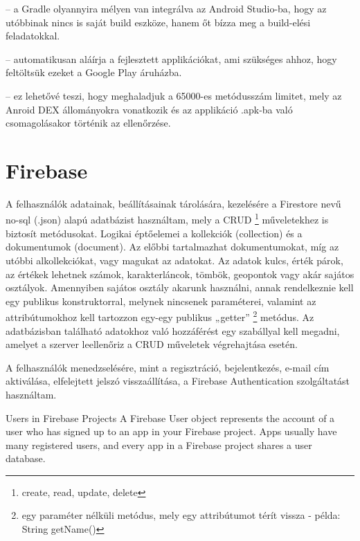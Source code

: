 \begin{description}
	\setlength{\itemsep}{0.04mm}
	\item[Teljes integráció az Android Studio-val] -- a Gradle olyannyira mélyen van integrálva az Android Studio-ba, hogy az utóbbinak nincs is saját build eszköze, hanem őt bízza meg a build-elési feladatokkal.
	\item[Automatikus aláírás] -- automatikusan aláírja a fejlesztett applikációkat, ami szükséges ahhoz, hogy feltöltsük ezeket a Google Play áruházba.
	\item[Multidex támogatás] -- ez lehetővé teszi, hogy meghaladjuk a 65000-es metódusszám limitet, mely az Anroid DEX állományokra vonatkozik és az applikáció .apk-ba való csomagolásakor történik az ellenőrzése.
\end{description}

\section{Firebase}\label{sec:ALAP:szerkeszt}

A felhasználók adatainak, beállításainak tárolására, kezelésére a Firestore nevű no-sql (.json) alapú adatbázist használtam, mely a CRUD%
\footnote{ %
	create, read, update, delete
}  %
 műveletekhez is biztosít metódusokat. Logikai éptőelemei a kollekciók (collection) és a dokumentumok (document). Az előbbi tartalmazhat dokumentumokat, míg az utóbbi alkollekciókat, vagy magukat az adatokat. Az adatok kulcs, érték párok, az értékek lehetnek számok, karakterláncok, tömbök, geopontok vagy akár sajátos osztályok. Amennyiben sajátos osztály akarunk használni, annak rendelkeznie kell egy publikus konstruktorral, melynek nincsenek paraméterei, valamint az attribútumokhoz kell tartozzon egy-egy publikus „getter”%
 \footnote{ %
 	egy paraméter nélküli metódus, mely egy attribútumot térít vissza - példa: String getName()
 }  %
 metódus. Az adatbázisban található adatokhoz való hozzáférést egy szabállyal kell megadni, amelyet a szerver leellenőriz a CRUD műveletek végrehajtása esetén.

A felhasználók menedzselésére, mint a regisztráció, bejelentkezés, e-mail cím aktiválása, elfelejtett jelszó visszaállítása, a Firebase Authentication szolgáltatást használtam.



Users in Firebase Projects
A Firebase User object represents the account of a user who has signed up to an app in your Firebase project. Apps usually have many registered users, and every app in a Firebase project shares a user database.


